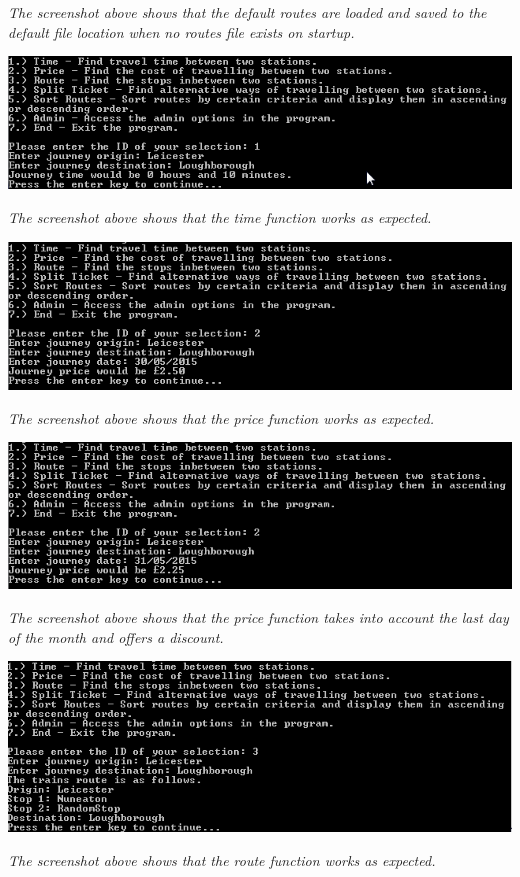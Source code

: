 \documentclass[10pt, a4paper]{article}
\begin{document}
\textit{The screenshot above shows that the default routes are loaded and saved to the default file location when no routes file exists on startup.}

\includegraphics{Functionality2.png}

\textit{The screenshot above shows that the time function works as expected.}

\includegraphics{Functionality3.png}

\textit{The screenshot above shows that the price function works as expected.}

\includegraphics{Functionality4.png}

\textit{The screenshot above shows that the price function takes into account the last day of the month and offers a discount.}

\includegraphics{Functionality5.png}

\textit{The screenshot above shows that the route function works as expected.}
\end{document}
